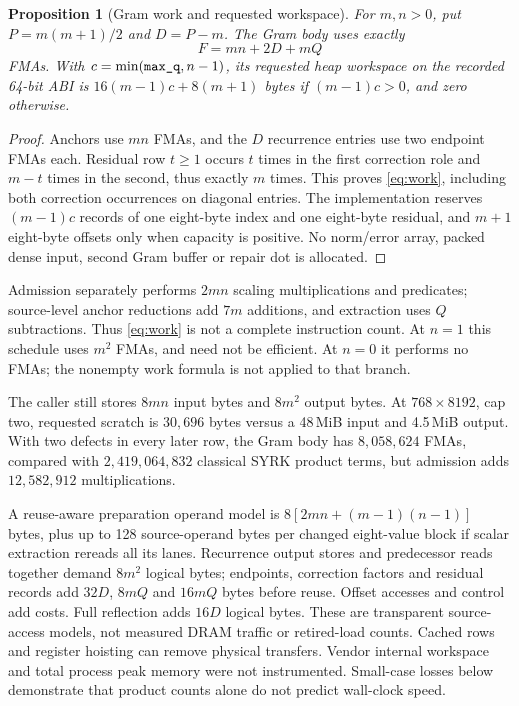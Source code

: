 \documentclass[10pt,a4paper]{article}
\newtheorem{proposition}[theorem]{Proposition}
\begin{document}
\begin{proposition}[Gram work and requested workspace]\label{prop:work}
For $m,n>0$, put $P=m(m+1)/2$ and $D=P-m$. The Gram body uses exactly
\begin{equation}\label{eq:work}
 F=mn+2D+mQ
\end{equation}
FMAs. With $c=\min(\textnormal{\texttt{max\_q}},n-1)$, its requested heap workspace on the
recorded 64-bit ABI is $16(m-1)c+8(m+1)$ bytes if $(m-1)c>0$, and zero otherwise.
\end{proposition}
\begin{proof}
Anchors use $mn$ FMAs, and the $D$ recurrence entries use two endpoint FMAs
each. Residual row $t\ge1$ occurs $t$ times in the first correction role and
$m-t$ times in the second, thus exactly $m$ times. This proves \eqref{eq:work},
including both correction occurrences on diagonal entries. The implementation
reserves $(m-1)c$ records of one eight-byte index and one eight-byte residual,
and $m+1$ eight-byte offsets only when capacity is positive. No norm/error
array, packed dense input, second Gram buffer or repair dot is allocated.
\end{proof}
Admission separately performs $2mn$ scaling multiplications and predicates;
source-level anchor reductions add $7m$ additions, and extraction uses $Q$
subtractions. Thus \eqref{eq:work} is not a complete instruction count.
At $n=1$ this schedule uses $m^2$ FMAs, and need not be efficient. At $n=0$
it performs no FMAs; the nonempty work formula is not applied to that branch.

The caller still stores $8mn$ input bytes and $8m^2$ output bytes. At
$768\times8192$, cap two, requested scratch is $30{,}696$ bytes versus a
48\,MiB input and 4.5\,MiB output. With two defects in every later row,
the Gram body has $8{,}058{,}624$ FMAs, compared with $2{,}419{,}064{,}832$
classical SYRK product terms, but admission adds $12{,}582{,}912$ multiplications.

A reuse-aware preparation operand model is $8[2mn+(m-1)(n-1)]$ bytes, plus
up to 128 source-operand bytes per changed eight-value block if scalar
extraction rereads all its lanes. Recurrence output stores and predecessor
reads together demand $8m^2$ logical bytes; endpoints, correction factors
and residual records add $32D$, $8mQ$ and $16mQ$ bytes before reuse. Offset
accesses and control add costs. Full reflection adds $16D$ logical bytes.
These are transparent source-access models, not measured DRAM traffic or
retired-load counts. Cached rows and register hoisting can remove physical
transfers. Vendor internal workspace and total process peak memory were not
instrumented. Small-case losses below demonstrate that product counts alone
do not predict wall-clock speed.
\end{document}
